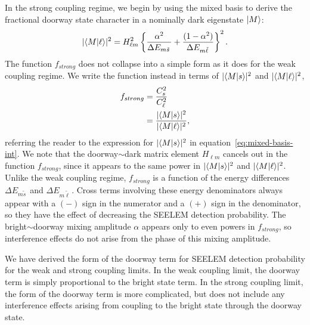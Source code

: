 \documentclass[12pt]{mitthesis}
\newcommand{\TODO} [1]{\textcolor{magenta}{\textbf{TODO:} #1}}
\newcommand{\ts}{\tilde{s}\,}
\newcommand{\tl}{\tilde{\ell}\,}
\begin{document}
In the strong coupling regime, we begin by using the mixed basis to
derive the fractional doorway state character in a nominally dark
eigenstate $\mathinner{|{M}\rangle}$:
\begin{equation}
  \lvert \braket{M|\ell} \rvert^2 = 
  H_{\ell m}^2 \left \lbrace
    \frac{\alpha^2}{\Delta E_{m \ts}} +
    \frac{(1-\alpha^2)}{\Delta E_{m \tl}}
  \right \rbrace^2.
\end{equation}
The function $f_{strong}$ does not collapse into a simple form as it
does for the weak coupling regime.  We write the function instead in
terms of $\lvert \mathinner{\langle{M|s}\rangle} \rvert^2$ and $\lvert \mathinner{\langle{M|\ell}\rangle}
\rvert^2$,
\begin{equation}
  \begin{split}
    f_{strong} &= \frac{C_s^2}{C_{\ell}^2}\\
    &= \frac{\lvert \mathinner{\langle{M|s}\rangle} \rvert^2}
    {\lvert \mathinner{\langle{M|\ell}\rangle} \rvert^2},\\
  \end{split}
\end{equation}
referring the reader to the expression for $\lvert \mathinner{\langle{M|s}\rangle}
\rvert^2$ in equation~\ref{eq:mixed-basis-int}.  We note that the
doorway$\sim$dark matrix element $H_{\ell m}$ cancels out in the
function $f_{strong}$, since it appears to the same power in $\lvert
\mathinner{\langle{M|s}\rangle} \rvert^2$ and $\lvert \mathinner{\langle{M|\ell}\rangle} \rvert^2$.  Unlike
the weak coupling regime, $f_{strong}$ is a function of the energy
differences $\Delta E_{m \ts}$ and $\Delta E_{m \tl}$.  Cross terms
involving these energy denominators always appear with a $(-)$ sign in
the numerator and a $(+)$ sign in the denominator, so they have the
effect of decreasing the SEELEM detection probability.  The
bright$\sim$doorway mixing amplitude $\alpha$ appears only to even
powers in $f_{strong}$, so interference effects do not arise from the
phase of this mixing amplitude.  



We have derived the form of the doorway term for SEELEM detection
probability for the weak and strong coupling limits.  In the weak
coupling limit, the doorway term is simply proportional to the bright
state term.  In the strong coupling limit, the form of the doorway
term is more complicated, but does not include any interference effects
arising from coupling to the bright state through the doorway state.
\end{document}
